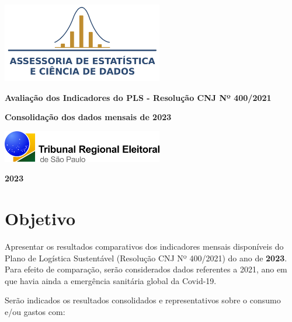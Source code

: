 \documentclass[
  a4paper,
  DIV=11,
  numbers=noendperiod]{scrartcl}
\author{}
\date{}
\begin{document}
\ifdefined\Shaded\renewenvironment{Shaded}{\begin{tcolorbox}[breakable, frame hidden, sharp corners, boxrule=0pt, borderline west={3pt}{0pt}{shadecolor}, enhanced, interior hidden]}{\end{tcolorbox}}\fi

\thispagestyle{empty}
\begin{center}
\includegraphics[width=7cm]{logo_assec.png}
\end{center}
\vspace{3cm}
\begin{center}
\Huge\textbf{Avaliação dos Indicadores do PLS - Resolução CNJ Nº 400/2021} 
\end{center}
\begin{center}
\Huge\textbf{Consolidação dos dados mensais de 2023}
\end{center}
\begin{center}
\vspace{6cm}
\includegraphics[width=7cm]{logo_tre.png}
\end{center}
\begin{center}
\Large\textbf{2023}
\end{center}
\newpage
\tableofcontents
\newpage

\hypertarget{objetivo}{%
\section{Objetivo}\label{objetivo}}

Apresentar os resultados comparativos dos indicadores mensais
disponíveis do Plano de Logística Sustentável (Resolução CNJ Nº
400/2021) do ano de \textbf{2023}. Para efeito de comparação, serão
considerados dados referentes a 2021, ano em que havia ainda a
emergência sanitária global da Covid-19.

Serão indicados os resultados consolidados e representativos sobre o
consumo e/ou gastos com:
\end{document}
